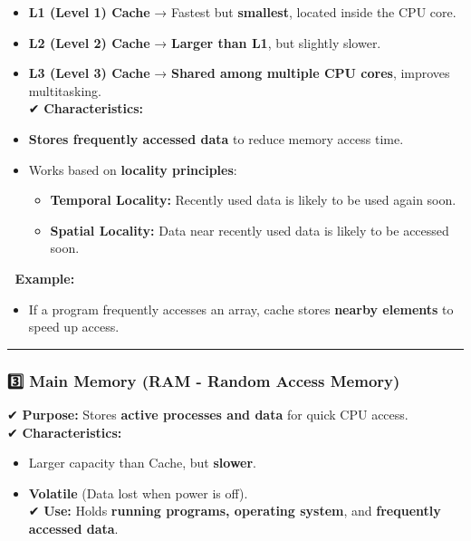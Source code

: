 \documentclass[
]{article}
\providecommand{\tightlist}{%
  \setlength{\itemsep}{0pt}\setlength{\parskip}{0pt}}
\begin{document}
\begin{itemize}
\tightlist
\item
  \textbf{L1 (Level 1) Cache} → Fastest but \textbf{smallest}, located
  inside the CPU core.
\item
  \textbf{L2 (Level 2) Cache} → \textbf{Larger than L1}, but slightly
  slower.
\item
  \textbf{L3 (Level 3) Cache} → \textbf{Shared among multiple CPU
  cores}, improves multitasking.\\
  ✔ \textbf{Characteristics:}
\item
  \textbf{Stores frequently accessed data} to reduce memory access time.
\item
  Works based on \textbf{locality principles}:

  \begin{itemize}
  \tightlist
  \item
    \textbf{Temporal Locality:} Recently used data is likely to be used
    again soon.
  \item
    \textbf{Spatial Locality:} Data near recently used data is likely to
    be accessed soon.
  \end{itemize}
\end{itemize}

📌 \textbf{Example:}

\begin{itemize}
\tightlist
\item
  If a program frequently accesses an array, cache stores \textbf{nearby
  elements} to speed up access.
\end{itemize}

\begin{center}\rule{0.5\linewidth}{0.5pt}\end{center}

\subsubsection{\texorpdfstring{\textbf{3️⃣ Main Memory (RAM - Random
Access
Memory)}}{3️⃣ Main Memory (RAM - Random Access Memory)}}\label{main-memory-ram---random-access-memory}

✔ \textbf{Purpose:} Stores \textbf{active processes and data} for quick
CPU access.\\
✔ \textbf{Characteristics:}

\begin{itemize}
\tightlist
\item
  Larger capacity than Cache, but \textbf{slower}.
\item
  \textbf{Volatile} (Data lost when power is off).\\
  ✔ \textbf{Use:} Holds \textbf{running programs, operating system}, and
  \textbf{frequently accessed data}.
\end{itemize}
\end{document}
